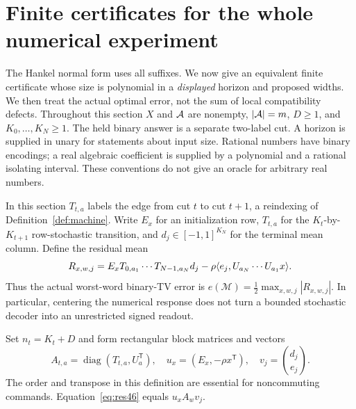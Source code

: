 \section{Finite certificates for the whole numerical experiment}\label{sec:cert46}
The Hankel normal form uses all suffixes. We now give an equivalent
finite certificate whose size is polynomial in a \emph{displayed}
horizon and proposed widths. We then treat the actual optimal error,
not the sum of local compatibility defects. Throughout this section
$X$ and $\mathcal A$ are nonempty, $|\mathcal A|=m$, $D\ge1$, and
$K_0,\ldots,K_N\ge1$. The held binary answer is a separate two-label
cut. A horizon is supplied in unary for statements about input size.
Rational numbers have binary encodings; a real algebraic coefficient
is supplied by a polynomial and a rational isolating interval.
These conventions do not give an oracle for arbitrary real numbers.

In this section $T_{t,a}$ labels the edge from cut $t$ to cut $t+1$,
a reindexing of Definition~\ref{def:machine}. Write $E_x$ for an initialization row, $T_{t,a}$ for the
$K_t$-by-$K_{t+1}$ row-stochastic transition, and $d_j\in[-1,1]^{K_N}$
for the terminal mean column. Define the residual mean
\begin{equation}\label{eq:res46}
 R_{x,w,j}=E_xT_{0,a_1}\cdots T_{N-1,a_N}d_j
             -\rho\langle e_j,U_{a_N}\cdots U_{a_1}x\rangle.
\end{equation}
Thus the actual worst-word binary-TV error is
$e(\mathcal M)=\frac12\max_{x,w,j}|R_{x,w,j}|$.
In particular, centering the numerical response does not turn a
bounded stochastic decoder into an unrestricted signed readout.

Set $n_t=K_t+D$ and form rectangular block matrices and vectors
\begin{equation}\label{eq:aug46}
 A_{t,a}=\operatorname{diag}(T_{t,a},U_a^{\mathsf T}),\quad
 u_x=(E_x,-\rho x^{\mathsf T}),\quad
 v_j=\binom{d_j}{e_j}.
\end{equation}
The order and transpose in this definition are essential for
noncommuting commands. Equation~\eqref{eq:res46} equals $u_xA_wv_j$.

